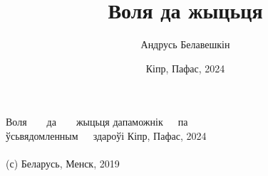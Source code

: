 \documentclass[letterpaper,11pt,openany,twocolumn]{memoir}
\author{Андрусь Белавешкін}
\title{Воля да жыцьця}
\date{Кіпр, Пафас, 2024}
\begin{document}
%

\begin{titlingpage}
      {Воля~~~~да~~~~жыцьця}
      {дапаможнік~~~па\\ўсьвядомленным~~~здароўі}
      {Кіпр, Пафас, 2024 \\~\\ (с) Беларусь, Менск, 2019}

\end{titlingpage}

\pagestyle{headings}
\setcounter{page}{3}
\setcounter{tocdepth}{1}
\tableofcontents*
\clearpage

















\end{document}
